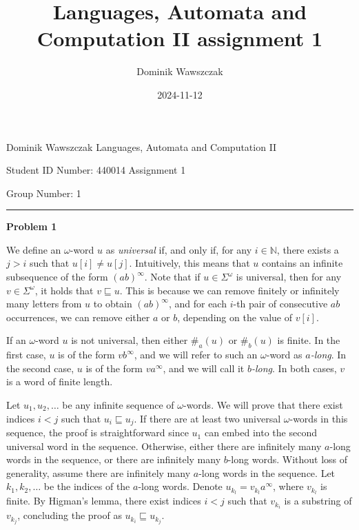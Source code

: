 \documentclass[12pt]{article}
\title{Languages, Automata and Computation II assignment 1}
\author{Dominik Wawszczak}
\date{2024-11-12}
\begin{document}
	\setlength{\parindent}{0 cm}
	
	Dominik Wawszczak \hfill Languages, Automata and Computation II
	
	Student ID Number: 440014 \hfill Assignment 1
	
	Group Number: 1
	
	\bigskip
	\hrule
	\bigskip
	
	\textbf{Problem 1}
	
	\medskip
	
	We define an \(\omega\)-word \(u\) as \textit{universal} if, and only if,
	for any \(i \in \mathbb{N}\), there exists a \(j > i\) such that \(u[i] \neq
	u[j]\). Intuitively, this means that \(u\) contains an infinite subsequence
	of the form \((ab)^{\infty}\). Note that if \(u \in \Sigma^{\omega}\) is
	universal, then for any \(v \in \Sigma^{\omega}\), it holds that \(v
	\sqsubseteq u\). This is because we can remove finitely or infinitely many
	letters from \(u\) to obtain \((ab)^{\infty}\), and for each \(i\)-th pair
	of consecutive \(ab\) occurrences, we can remove either \(a\) or \(b\),
	depending on the value of \(v[i]\).
	
	\medskip
	
	If an \(\omega\)-word \(u\) is not universal, then either \(\#_{a}(u)\) or
	\(\#_{b}(u)\) is finite. In the first case, \(u\) is of the form
	\(vb^{\infty}\), and we will refer to such an \(\omega\)-word as
	\textit{\(a\)-long}. In the second case, \(u\) is of the form
	\(va^{\infty}\), and we will call it \textit{\(b\)-long}. In both cases,
	\(v\) is a word of finite length.
	
	\medskip
	
	Let \(u_{1}, u_{2}, \ldots\) be any infinite sequence of \(\omega\)-words.
	We will prove that there exist indices \(i < j\) such that \(u_{i}
	\sqsubseteq u_{j}\). If there are at least two universal \(\omega\)-words in
	this sequence, the proof is straightforward since \(u_{1}\) can embed into
	the second universal word in the sequence. Otherwise, either there are
	infinitely many \(a\)-long words in the sequence, or there are infinitely
	many \(b\)-long words. Without loss of generality, assume there are
	infinitely many \(a\)-long words in the sequence. Let \(k_{1}, k_{2},
	\ldots\) be the indices of the \(a\)-long words. Denote \(u_{k_{l}} =
	v_{k_{l}}a^{\infty}\), where \(v_{k_{l}}\) is finite. By Higman's lemma,
	there exist indices \(i < j\) such that \(v_{k_{i}}\) is a substring of
	\(v_{k_{j}}\), concluding the proof as \(u_{k_{i}} \sqsubseteq u_{k_{j}}\).
	
\end{document}

